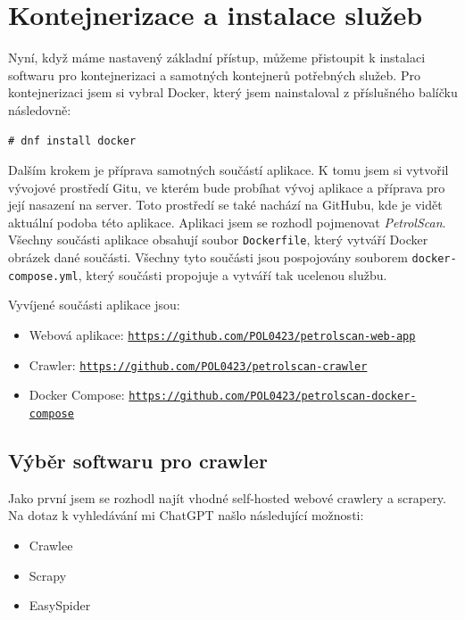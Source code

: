 \section{Kontejnerizace a instalace služeb}
Nyní, když máme nastavený základní přístup, můžeme přistoupit
k instalaci softwaru pro kontejnerizaci a samotných kontejnerů
potřebných služeb. Pro kontejnerizaci jsem si vybral Docker,
který jsem nainstaloval z příslušného balíčku následovně:

\begin{verbatim}
# dnf install docker
\end{verbatim}

Dalším krokem je příprava samotných součástí aplikace. K tomu
jsem si vytvořil vývojové prostředí Gitu, ve kterém bude
probíhat vývoj aplikace a příprava pro její nasazení na server.
Toto prostředí se také nachází na GitHubu, kde je vidět
aktuální podoba této aplikace. Aplikaci jsem se rozhodl pojmenovat
\emph{PetrolScan}. Všechny součásti aplikace obsahují soubor
\texttt{Dockerfile}, který vytváří Docker obrázek dané součásti.
Všechny tyto součásti jsou pospojovány souborem \texttt{docker-compose.yml},
který součásti propojuje a vytváří tak ucelenou službu.

Vyvíjené součásti aplikace jsou:

\begin{itemize}
    \item Webová aplikace:
        \texttt{\url{https://github.com/POL0423/petrolscan-web-app}}
    \item Crawler:
        \texttt{\url{https://github.com/POL0423/petrolscan-crawler}}
    \item Docker Compose:
        \texttt{\url{https://github.com/POL0423/petrolscan-docker-compose}}
\end{itemize}

\subsection{Výběr softwaru pro crawler}

Jako první jsem se rozhodl najít vhodné self-hosted webové crawlery
a scrapery. Na dotaz k vyhledávání mi ChatGPT našlo následující možnosti:

\begin{itemize}
    \item Crawlee
    \item Scrapy
    \item EasySpider
\end{itemize}

